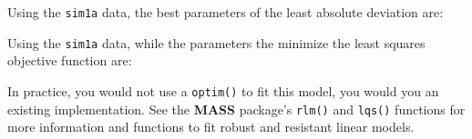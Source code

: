 \documentclass[]{book}
\newenvironment{Shaded}{\begin{snugshade}}{\end{snugshade}}
\newcommand{\CommentTok}[1]{\textcolor[rgb]{0.56,0.35,0.01}{\textit{#1}}}
\newcommand{\ControlFlowTok}[1]{\textcolor[rgb]{0.13,0.29,0.53}{\textbf{#1}}}
\newcommand{\DataTypeTok}[1]{\textcolor[rgb]{0.13,0.29,0.53}{#1}}
\newcommand{\DecValTok}[1]{\textcolor[rgb]{0.00,0.00,0.81}{#1}}
\newcommand{\KeywordTok}[1]{\textcolor[rgb]{0.13,0.29,0.53}{\textbf{#1}}}
\newcommand{\NormalTok}[1]{#1}
\newcommand{\OperatorTok}[1]{\textcolor[rgb]{0.81,0.36,0.00}{\textbf{#1}}}
\newcommand{\StringTok}[1]{\textcolor[rgb]{0.31,0.60,0.02}{#1}}
\theoremstyle{plain}
\theoremstyle{remark}
\begin{document}
\begin{Shaded}
\end{Shaded}

Using the \texttt{sim1a} data, the best parameters of the least absolute
deviation are:

\begin{Shaded}
\end{Shaded}

Using the \texttt{sim1a} data, while the parameters the minimize the
least squares objective function are:

\begin{Shaded}
\end{Shaded}

In practice, you would not use a \texttt{optim()} to fit this model, you
would you an existing implementation. See the \textbf{MASS} package's
\texttt{rlm()} and \texttt{lqs()} functions for more information and
functions to fit robust and resistant linear models.
\end{document}
